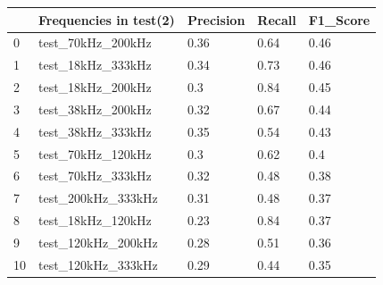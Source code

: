 \begin{longtable}{lllll}
\hline
\multicolumn{1}{|l|}{} & \multicolumn{1}{l|}{Frequencies in test(2)} & \multicolumn{1}{l|}{Precision} & \multicolumn{1}{l|}{Recall} & \multicolumn{1}{l|}{F1\_Score} \\ \hline
\endfirsthead
%
\endhead
%
\hline
\endfoot
%
\endlastfoot
%
0                      & test\_70kHz\_200kHz                         & 0.36                           & 0.64                        & 0.46                           \\
1                      & test\_18kHz\_333kHz                         & 0.34                           & 0.73                        & 0.46                           \\
2                      & test\_18kHz\_200kHz                         & 0.3                            & 0.84                        & 0.45                           \\
3                      & test\_38kHz\_200kHz                         & 0.32                           & 0.67                        & 0.44                           \\
4                      & test\_38kHz\_333kHz                         & 0.35                           & 0.54                        & 0.43                           \\
5                      & test\_70kHz\_120kHz                         & 0.3                            & 0.62                        & 0.4                            \\
6                      & test\_70kHz\_333kHz                         & 0.32                           & 0.48                        & 0.38                           \\
7                      & test\_200kHz\_333kHz                        & 0.31                           & 0.48                        & 0.37                           \\
8                      & test\_18kHz\_120kHz                         & 0.23                           & 0.84                        & 0.37                           \\
9                      & test\_120kHz\_200kHz                        & 0.28                           & 0.51                        & 0.36                           \\
10                     & test\_120kHz\_333kHz                        & 0.29                           & 0.44                        & 0.35                           \\

\end{longtable}
